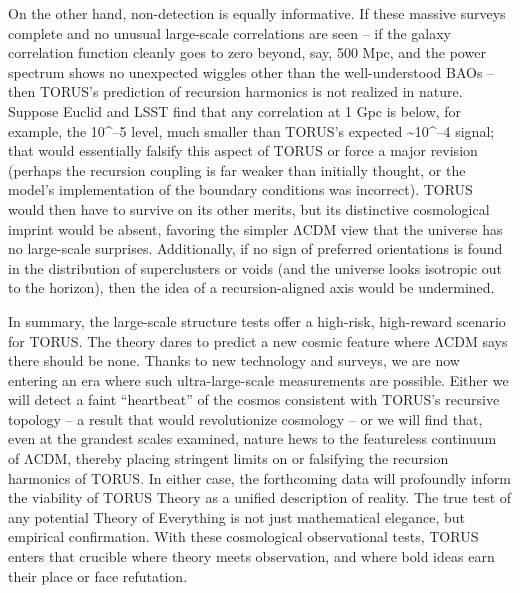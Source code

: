 \documentclass[
]{article}
\begin{document}
On the other hand, non-detection is equally informative. If these
massive surveys complete and no unusual large-scale correlations are
seen -- if the galaxy correlation function cleanly goes to zero beyond,
say, 500 Mpc, and the power spectrum shows no unexpected wiggles other
than the well-understood BAOs -- then TORUS's prediction of recursion
harmonics is not realized in nature. Suppose Euclid and LSST find that
any correlation at 1 Gpc is below, for example, the 10\^{}--5 level,
much smaller than TORUS's expected \textasciitilde10\^{}--4 signal; that
would essentially falsify this aspect of TORUS or force a major revision
(perhaps the recursion coupling is far weaker than initially thought, or
the model's implementation of the boundary conditions was incorrect).
TORUS would then have to survive on its other merits, but its
distinctive cosmological imprint would be absent, favoring the simpler
ΛCDM view that the universe has no large-scale surprises. Additionally,
if no sign of preferred orientations is found in the distribution of
superclusters or voids (and the universe looks isotropic out to the
horizon), then the idea of a recursion-aligned axis would be undermined.

In summary, the large-scale structure tests offer a high-risk,
high-reward scenario for TORUS. The theory dares to predict a new cosmic
feature where ΛCDM says there should be none. Thanks to new technology
and surveys, we are now entering an era where such ultra-large-scale
measurements are possible. Either we will detect a faint ``heartbeat''
of the cosmos consistent with TORUS's recursive topology -- a result
that would revolutionize cosmology -- or we will find that, even at the
grandest scales examined, nature hews to the featureless continuum of
ΛCDM, thereby placing stringent limits on or falsifying the recursion
harmonics of TORUS. In either case, the forthcoming data will profoundly
inform the viability of TORUS Theory as a unified description of
reality. The true test of any potential Theory of Everything is not just
mathematical elegance, but empirical confirmation. With these
cosmological observational tests, TORUS enters that crucible where
theory meets observation, and where bold ideas earn their place or face
refutation.
\end{document}
